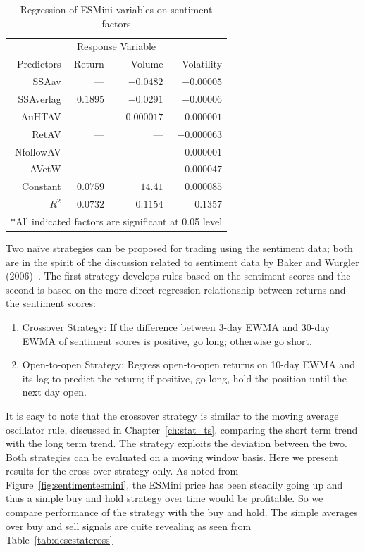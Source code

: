 	\begin{table}[!ht]
	\centering
	\caption{Regression of ESMini variables on sentiment factors \label{tab:regesmini}}
	\begin{tabular}{rrrr}
	\multicolumn{4}{c}{Response Variable} \\
	Predictors & Return & Volume & Volatility \\ \hline
	SSAav & --- & $-0.0482$ & $-0.00005$ \\
	SSAverlag & $0.1895$ & $-0.0291$ & $-0.00006$ \\
	AuHTAV & --- & $-0.000017$ & $-0.000001$ \\
	RetAV & --- & --- & $-0.000063$ \\
	NfollowAV & --- & --- & $-0.000001$ \\
	AVetW & --- & --- & $0.000047$ \\
	Constant & $0.0759$ & $14.41$ & $0.000085$ \\ \hline
	$R^2$ & $0.0732$ & $0.1154$ & $0.1357$ \\ \hline
	\multicolumn{4}{c}{$\ast$All indicated factors are significant at 0.05 level}
	\end{tabular} 
	\end{table}

Two na\"ive strategies can be proposed for trading using the sentiment data; both are in the spirit of the discussion related to sentiment data by Baker and Wurgler (2006)~\cite{baker2006investor}. The first strategy develops rules based on the sentiment scores and the second is based on the more direct regression relationship between returns and the sentiment scores: 

\begin{enumerate}[1.]
\item Crossover Strategy: If the difference between 3-day EWMA and 30-day EWMA of sentiment scores is positive, go long; otherwise go short. 
\item Open-to-open Strategy: Regress open-to-open returns on 10-day EWMA and its lag to predict the return; if positive, go long, hold the position until the next day open. 
\end{enumerate}


It is easy to note that the crossover strategy is similar to the moving average oscillator rule, discussed in Chapter~\ref{ch:stat_ts}, comparing the short term trend with the long term trend. The strategy exploits the deviation between the two. Both strategies can be evaluated on a moving window basis. Here we present results for the cross-over strategy only. As noted from Figure~\ref{fig:sentimentesmini}, the ESMini price has been steadily going up and thus a simple buy and hold strategy over time would be profitable. So we compare performance of the strategy with the buy and hold. The simple averages over buy and sell signals are quite revealing as seen from Table~\ref{tab:descstatcross}

